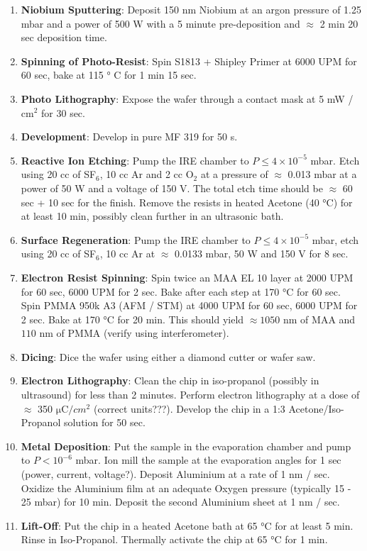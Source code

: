\begin{enumerate}
\item \textbf{Niobium Sputtering}: Deposit 150 nm Niobium at an argon pressure of 1.25 mbar and a power of 500 W with a 5 minute pre-deposition and $\approx$ 2 min 20 sec deposition time.
\item \textbf{Spinning of Photo-Resist}: Spin S1813 + Shipley Primer at 6000 UPM for 60 sec, bake at 115 ° C for 1 min 15 sec.
\item \textbf{Photo Lithography}: Expose the wafer through a contact mask at 5 mW / cm$^2$ for 30 sec.
\item \textbf{Development}: Develop in pure MF 319 for 50 s.
\item \textbf{Reactive Ion Etching}: Pump the IRE chamber to $P\le 4\times 10^{-5}$ mbar. Etch using 20 cc of SF$_6$, 10 cc Ar and 2 cc O$_2$ at a pressure of $\approx$ 0.013 mbar at a power of 50 W and a voltage of 150 V. The total etch time should be $\approx $ 60 sec + 10 sec for the finish. Remove the resists in heated Acetone (40 °C) for at least 10 min, possibly clean further in an ultrasonic bath.
\item \textbf{Surface Regeneration}: Pump the IRE chamber  to $P\le 4\times 10^{-5}$ mbar, etch using 20 cc of SF$_6$, 10 cc Ar at $\approx$ 0.0133 mbar, 50 W and 150 V for 8 sec.
\item \textbf{Electron Resist Spinning}: Spin twice an MAA EL 10 layer at 2000 UPM for 60 sec, 6000 UPM for 2 sec. Bake after each step at 170 °C for 60 sec. Spin PMMA 950k A3 (AFM / STM) at 4000 UPM for 60 sec, 6000 UPM for 2 sec. Bake at 170 °C for 20 min. This should yield $\approx 1050$ nm of MAA and $110$ nm of PMMA (verify using interferometer).
\item \textbf{Dicing}: Dice the wafer using either a diamond cutter or wafer saw.
\item \textbf{Electron Lithography}: Clean the chip in iso-propanol (possibly in ultrasound) for less than 2 minutes. Perform electron lithography at a dose of $\approx$ 350 $\mathrm{\mu C}/cm^2$ (correct units???). Develop the chip in a 1:3 Acetone/Iso-Propanol solution for 50 sec.
\item \textbf{Metal Deposition}: Put the sample in the evaporation chamber and pump to $P<10^{-6}$ mbar. Ion mill the sample at the evaporation angles for 1 sec (power, current, voltage?). Deposit Aluminium at a rate of 1 nm / sec. Oxidize the Aluminium film at an adequate Oxygen pressure (typically 15 - 25 mbar) for 10 min. Deposit the second Aluminium sheet at 1 nm / sec.
\item \textbf{Lift-Off}: Put the chip in a heated Acetone bath at 65 °C for at least 5 min. Rinse in Iso-Propanol. Thermally activate the chip at 65 °C for 1 min.

\end{enumerate}

